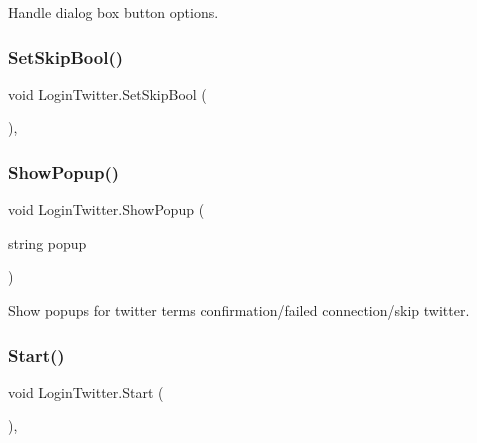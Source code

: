 Handle dialog box button options. 

\mbox{\label{class_login_twitter_a6291e32f19d1cae3ea13e08b5401960f}} 
\subsubsection{\texorpdfstring{SetSkipBool()}{SetSkipBool()}}
{\footnotesize\ttfamily void Login\+Twitter.\+Set\+Skip\+Bool (\begin{DoxyParamCaption}{ }\end{DoxyParamCaption})\hspace{0.3cm}{\ttfamily [inline]}, {\ttfamily [private]}}

\mbox{\label{class_login_twitter_aa41d307ac0099b8dd187f05d3d2aeab3}} 
\subsubsection{\texorpdfstring{ShowPopup()}{ShowPopup()}}
{\footnotesize\ttfamily void Login\+Twitter.\+Show\+Popup (\begin{DoxyParamCaption}\item[{string}]{popup }\end{DoxyParamCaption})\hspace{0.3cm}{\ttfamily [inline]}}



Show popups for twitter terms confirmation/failed connection/skip twitter. 

\mbox{\label{class_login_twitter_aa93b8ee84e787d99c171d9086c64275c}} 
\subsubsection{\texorpdfstring{Start()}{Start()}}
{\footnotesize\ttfamily void Login\+Twitter.\+Start (\begin{DoxyParamCaption}{ }\end{DoxyParamCaption})\hspace{0.3cm}{\ttfamily [inline]}, {\ttfamily [private]}}

